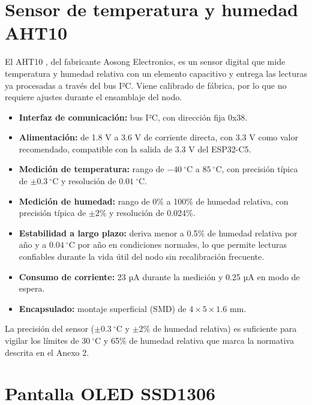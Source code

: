 \section{Sensor de temperatura y humedad AHT10}

El AHT10 \cite{aht10-datasheet}, del fabricante Aosong Electronics, es un sensor digital que mide temperatura y humedad relativa con un elemento capacitivo y entrega las lecturas ya procesadas a través del bus I²C. Viene calibrado de fábrica, por lo que no requiere ajustes durante el ensamblaje del nodo.

\begin{itemize}
    \item \textbf{Interfaz de comunicación:} bus I²C, con dirección fija 0x38.

    \item \textbf{Alimentación:} de 1.8 V a 3.6 V de corriente directa, con 3.3 V como valor recomendado, compatible con la salida de 3.3 V del ESP32-C5.

    \item \textbf{Medición de temperatura:} rango de $-40~^{\circ}\text{C}$ a $85~^{\circ}\text{C}$, con precisión típica de $\pm 0.3~^{\circ}\text{C}$ y resolución de $0.01~^{\circ}\text{C}$.

    \item \textbf{Medición de humedad:} rango de 0\% a 100\% de humedad relativa, con precisión típica de $\pm 2\%$ y resolución de 0.024\%.

    \item \textbf{Estabilidad a largo plazo:} deriva menor a 0.5\% de humedad relativa por año y a $0.04~^{\circ}\text{C}$ por año en condiciones normales, lo que permite lecturas confiables durante la vida útil del nodo sin recalibración frecuente.

    \item \textbf{Consumo de corriente:} 23 µA durante la medición y 0.25 µA en modo de espera.

    \item \textbf{Encapsulado:} montaje superficial (SMD) de $4 \times 5 \times 1.6$ mm.
\end{itemize}

La precisión del sensor ($\pm 0.3~^{\circ}\text{C}$ y $\pm 2\%$ de humedad relativa) es suficiente para vigilar los límites de $30~^{\circ}\text{C}$ y 65\% de humedad relativa que marca la normativa descrita en el Anexo 2.

\section{Pantalla OLED SSD1306}

